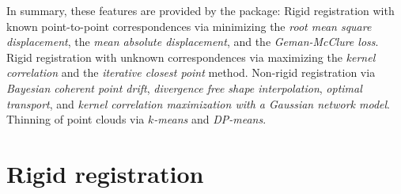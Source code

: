 In summary, these features are provided by the package: Rigid
registration with known point-to-point correspondences via minimizing
the \emph{root mean square displacement}, the \emph{mean absolute
displacement}, and the \emph{Geman-McClure loss}. Rigid registration
with unknown correspondences via maximizing the \emph{kernel
correlation} and the \emph{iterative closest point} method. Non-rigid
registration via \emph{Bayesian coherent point drift}, \emph{divergence
free shape interpolation}, \emph{optimal transport}, and \emph{kernel
correlation maximization with a Gaussian network model}. Thinning of
point clouds via \emph{\(k\)-means} and \emph{DP-means}.

\section{Rigid registration}
